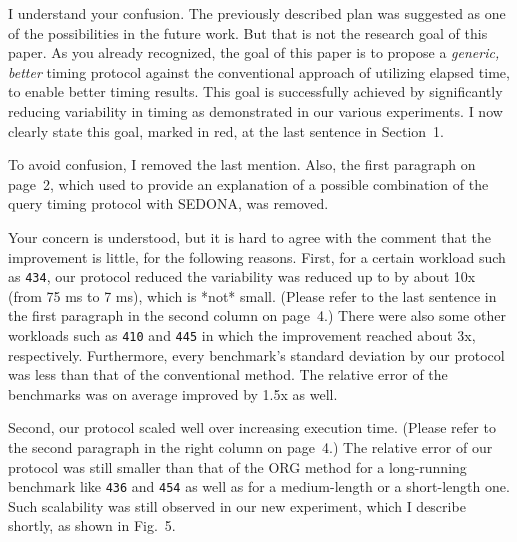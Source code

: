 \documentclass[10pt,letterpaper]{article}
\newenvironment{myindentpar}[1]%
{\begin{list}{}
         {\vspace{10pt}
					\setlength{\leftmargin}{#1}}
          \item[]
}
{\end{list}}
\newcommand{\rev}[1]{\begin{myindentpar}{.25in} {\em {\color{blue}{#1}}}\end{myindentpar}}
\begin{document}
I understand your confusion. The previously described plan was suggested as one of the possibilities in the future work. But that is not the research goal of this paper. 
As you already recognized, the goal of this paper is to propose a {\em generic, better} timing protocol against the conventional approach of utilizing elapsed time, 
to enable better timing results. This goal is successfully achieved 
by significantly reducing variability in timing as demonstrated in our various experiments.
I now clearly state this goal, marked in red, at the last sentence in Section~1. 

To avoid confusion, I removed the last mention. Also, the first paragraph on page~2, 
which used to provide an explanation of a possible combination of the query timing protocol 
with SEDONA, was removed.


\rev{
(2) If the proposed approach is for a generic purpose, there is a strong
doubt about usability. The improvement of the SEDONA is little. And the
extent of the each benchmark’s improvement described in Table 3
varies widely. Thus, the experimental results does not confirm whether
the SEDONA is widely practical or is useful. The description to clarify
the SEDONA’s characteristics is needed.
} 

Your concern is understood, but it is hard to agree with the comment that the improvement is little, for the following reasons.
First, for a certain workload such as {\tt 434}, 
our protocol reduced the variability was reduced up to by about 10x (from 75 ms to 7 ms), 
which is *not* small. (Please refer to the last sentence 
in the first paragraph in the second column on page~4.)
There were also some other workloads such as {\tt 410} and {\tt 445} 
in which the improvement reached about 3x, respectively. 
Furthermore, every benchmark's standard deviation by our protocol 
was less than that of the conventional method. 
The relative error of the benchmarks was on average improved 
by 1.5x as well.

Second, our protocol scaled well over increasing execution time. 
(Please refer to the second paragraph in the right column on page~4.)
The relative error of our protocol was still smaller than that of the ORG method 
for a long-running benchmark like {\tt 436} and {\tt 454} 
as well as for a medium-length or a short-length one. 
Such scalability was still observed in our new experiment, 
which I describe shortly, as shown in Fig.~5.
\end{document}
